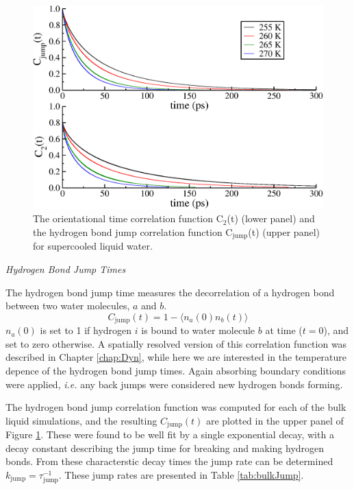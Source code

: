 \begin{figure}
\includegraphics[width=\linewidth]{Figures/jump_lcorr}
\caption{\label{fig:jump_lcorr} The orientational time correlation
  function C$_2$(t) (lower panel) and the hydrogen bond jump
  correlation function C$_\mathrm{jump}$(t) (upper panel) for
  supercooled liquid water. }
\end{figure}                


\begin{flushleft}
\textit{Hydrogen Bond Jump Times}
\end{flushleft}
The hydrogen bond jump time measures the decorrelation of a hydrogen
bond between two water molecules, $a$ and $b$. 
\begin{equation}\label{jump}
C_\mathrm{jump}(t) = 1 - \langle n_a(0) n_b(t) \rangle
\end{equation}
$n_a(0)$ is set to 1 if hydrogen $i$ is bound to water molecule $b$ at
time ($t=0$), and set to zero otherwise. A spatially resolved version
of this correlation function was described in Chapter \ref{chap:Dyn},
while here we are interested in the temperature depence of the
hydrogen bond jump times. Again absorbing boundary conditions were
applied, \textit{i.e.} any back jumps were considered new hydrogen
bonds forming.

The hydrogen bond jump correlation function was computed for each of
the bulk liquid simulations, and the resulting $C_\mathrm{jump}(t)$
are plotted in the upper panel of Figure \ref{fig:jump_lcorr}. These
were found to be well fit by a single exponential decay, with a decay
constant describing the jump time for breaking and making hydrogen
bonds. From these characterstic decay times the jump rate can be
determined $k_\mathrm{jump} = \tau_\mathrm{jump}^{-1}$. These jump
rates are presented in Table \ref{tab:bulkJump}.

